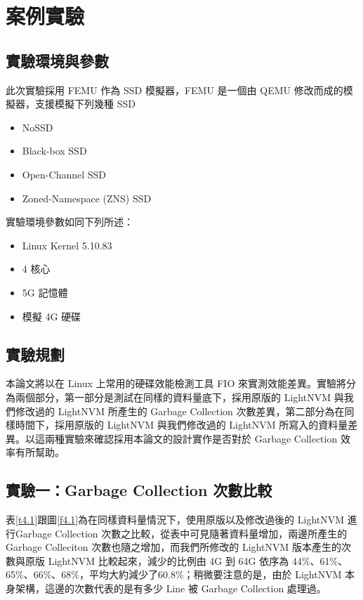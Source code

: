 \chapter{案例實驗}
\section{實驗環境與參數}
此次實驗採用 FEMU 作為 SSD 模擬器，FEMU 是一個由 QEMU \cite{bellard2005qemu}修改而成的模擬器\cite{210518}，支援模擬下列幾種 SSD
\begin{itemize}
    \item NoSSD
    \item Black-box SSD
    \item Open-Channel SSD
    \item Zoned-Namespace (ZNS) SSD
\end{itemize}
實驗環境參數如同下列所述：
\begin{itemize}
    \item Linux Kernel 5.10.83
    \item 4 核心
    \item 5G 記憶體
    \item 模擬 4G 硬碟
\end{itemize}

\section{實驗規劃}
\indent
本論文將以在 Linux 上常用的硬碟效能檢測工具 FIO 來實測效能差異。實驗將分為兩個部分，第一部分是測試在同樣的資料量底下，採用原版的 LightNVM 與我們修改過的 LightNVM 所產生的 Garbage Collection 次數差異，第二部分為在同樣時間下，採用原版的 LightNVM 與我們修改過的 LightNVM 所寫入的資料量差異。以這兩種實驗來確認採用本論文的設計實作是否對於 Garbage Collection 效率有所幫助。

\section{實驗一：Garbage Collection 次數比較}\label{s4.2}

\indent
表\ref{t4.1}跟圖\ref{f4.1}為在同樣資料量情況下，使用原版以及修改過後的 LightNVM 進行Garbage Collection 次數之比較，從表中可見隨著資料量增加，兩邊所產生的 Garbage Colleciton 次數也隨之增加，而我們所修改的 LightNVM 版本產生的次數與原版 LightNVM 比較起來，減少的比例由 4G 到 64G 依序為 44\%、61\%、65\%、66\%、68\%，平均大約減少了60.8\%；稍微要注意的是，由於 LightNVM 本身架構，這邊的次數代表的是有多少 Line 被 Garbage Collection 處理過。


